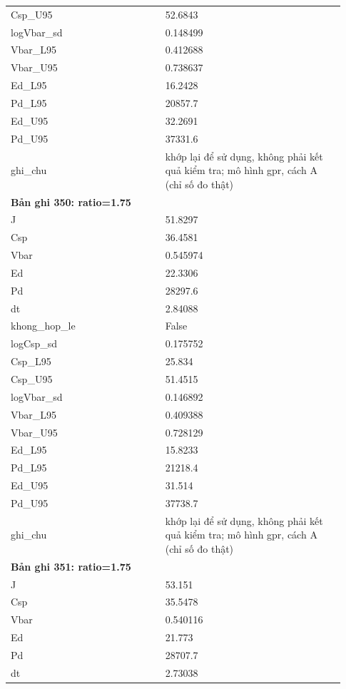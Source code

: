 \begin{longtable}{p{0.43\linewidth}p{0.50\linewidth}}
Csp\_\allowbreak U95 & 52.6843 \\
logVbar\_\allowbreak sd & 0.148499 \\
Vbar\_\allowbreak L95 & 0.412688 \\
Vbar\_\allowbreak U95 & 0.738637 \\
Ed\_\allowbreak L95 & 16.2428 \\
Pd\_\allowbreak L95 & 20857.7 \\
Ed\_\allowbreak U95 & 32.2691 \\
Pd\_\allowbreak U95 & 37331.6 \\
ghi\_\allowbreak chu & khớp lại để sử dụng, không phải kết quả kiểm tra; mô hình gpr, cách A (chỉ số đo thật) \\
\midrule
\multicolumn{2}{p{0.95\linewidth}}{\textbf{Bản ghi 350: ratio=1.75}} \\
J & 51.8297 \\
Csp & 36.4581 \\
Vbar & 0.545974 \\
Ed & 22.3306 \\
Pd & 28297.6 \\
dt & 2.84088 \\
khong\_\allowbreak hop\_\allowbreak le & False \\
logCsp\_\allowbreak sd & 0.175752 \\
Csp\_\allowbreak L95 & 25.834 \\
Csp\_\allowbreak U95 & 51.4515 \\
logVbar\_\allowbreak sd & 0.146892 \\
Vbar\_\allowbreak L95 & 0.409388 \\
Vbar\_\allowbreak U95 & 0.728129 \\
Ed\_\allowbreak L95 & 15.8233 \\
Pd\_\allowbreak L95 & 21218.4 \\
Ed\_\allowbreak U95 & 31.514 \\
Pd\_\allowbreak U95 & 37738.7 \\
ghi\_\allowbreak chu & khớp lại để sử dụng, không phải kết quả kiểm tra; mô hình gpr, cách A (chỉ số đo thật) \\
\midrule
\multicolumn{2}{p{0.95\linewidth}}{\textbf{Bản ghi 351: ratio=1.75}} \\
J & 53.151 \\
Csp & 35.5478 \\
Vbar & 0.540116 \\
Ed & 21.773 \\
Pd & 28707.7 \\
dt & 2.73038 \\

\end{longtable}
